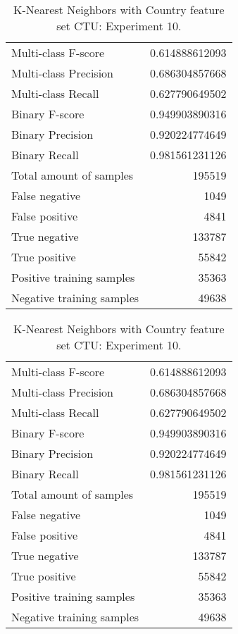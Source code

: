 \begin{table}[H]
\begin{minipage}{0.5\textwidth}
\caption{K-Nearest Neighbors with Country feature set CTU: Experiment 9.}
\centering
\begin{tabular}{l r}
\toprule
Multi-class F-score & 0.614888612093 \\
Multi-class Precision & 0.686304857668 \\
Multi-class Recall & 0.627790649502 \\
\midrule
Binary F-score & 0.949903890316 \\
Binary Precision & 0.920224774649 \\
Binary Recall & 0.981561231126 \\
\midrule
Total amount of samples & 195519 \\
False negative & 1049 \\
False positive & 4841 \\
True negative & 133787 \\
True positive & 55842 \\
\midrule
Positive training samples & 35363 \\
Negative training samples & 49638 \\
\bottomrule
\end{tabular}
\end{minipage}
\hfillx
\begin{minipage}{0.5\textwidth}
\caption{K-Nearest Neighbors with Country feature set CTU: Experiment 10.}
\centering
\begin{tabular}{l r}
\toprule
Multi-class F-score & 0.614888612093 \\
Multi-class Precision & 0.686304857668 \\
Multi-class Recall & 0.627790649502 \\
\midrule
Binary F-score & 0.949903890316 \\
Binary Precision & 0.920224774649 \\
Binary Recall & 0.981561231126 \\
\midrule
Total amount of samples & 195519 \\
False negative & 1049 \\
False positive & 4841 \\
True negative & 133787 \\
True positive & 55842 \\
\midrule
Positive training samples & 35363 \\
Negative training samples & 49638 \\
\bottomrule
\end{tabular}
\end{minipage}
\end{table}
